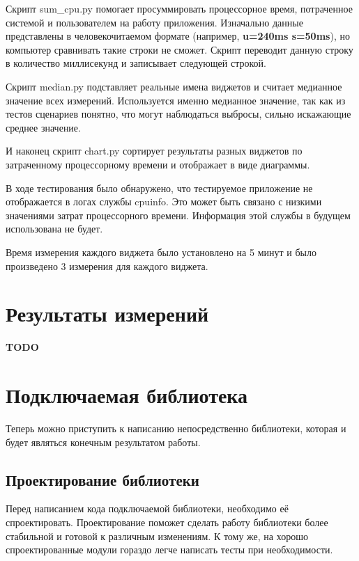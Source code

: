 \documentclass[a4paper,14pt]{extarticle} %
\begin{document}
	Скрипт sum\_cpu.py помогает просуммировать процессорное время, потраченное системой и пользователем на работу приложения. Изначально данные представлены в человекочитаемом формате (например, \textbf{u=240ms s=50ms}), но компьютер сравнивать такие строки не сможет. Скрипт переводит данную строку в количество миллисекунд и записывает следующей строкой.
	
	Скрипт median.py подставляет реальные имена виджетов и считает медианное значение всех измерений. Используется именно медианное значение, так как из тестов сценариев понятно, что могут наблюдаться выбросы, сильно искажающие среднее значение. 
	
	И наконец скрипт chart.py сортирует результаты разных виджетов по затраченному процессорному времени и отображает в виде диаграммы.
	
	В ходе тестирования было обнаружено, что тестируемое приложение не отображается в логах службы cpuinfo. Это может быть связано с низкими значениями затрат процессорного времени. Информация этой службы в будущем использована не будет.
	
	Время измерения каждого виджета было установлено на 5 минут и было произведено 3 измерения для каждого виджета.
	
	\newpage
	\section{Результаты измерений}
	
	\textbf{\Huge TODO}
	
	\newpage
	\section{Подключаемая библиотека}
	
	Теперь можно приступить к написанию непосредственно библиотеки, которая и будет являться конечным результатом работы.
	
	\subsection{Проектирование библиотеки}
	
	Перед написанием кода подключаемой библиотеки, необходимо её спроектировать. Проектирование поможет сделать работу библиотеки более стабильной и готовой к различным изменениям. К тому же, на хорошо спроектированные модули гораздо легче написать тесты при необходимости. 
	
\end{document}
